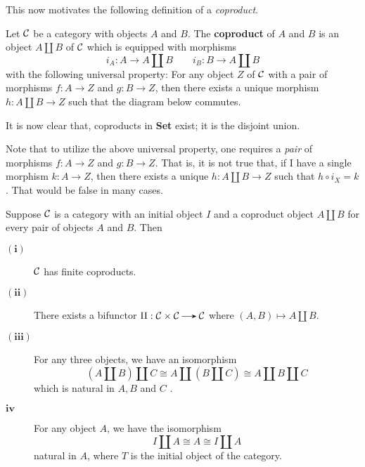 This now motivates the following definition of a \emph{coproduct}. 

\begin{definition}
    Let $\mathcal{C}$ be a category with objects $A$ and $B$. The \textbf{coproduct} of $A$ and $B$ 
    is an object $A \amalg B$ of $\mathcal{C}$ which is equipped with morphisms 
    \[
        i_A: A \to A \amalg B \qquad i_B: B \to A \amalg B
    \]
    with the following universal property: For any object $Z$ of $\mathcal{C}$ with a pair 
    of morphisms $f: A \to Z$ and $g: B \to Z$, then there exists a unique morphism 
    $h: A \amalg B \to Z$ such that the diagram below commutes. 
    \begin{center}
    \end{center}
\end{definition}

It is now clear that, coproducts in \textbf{Set} exist; it is the disjoint union.

\begin{remark}
    Note that to utilize the above universal property, one requires a \emph{pair} of morphisms 
    $f: A \to Z$ and $g: B \to Z$. That is, it is not true that, if I have a single 
    morphism $k: A \to Z$, then there exists a unique $h: A \amalg B \to Z$ such that $h \circ i_X = k$. 
    That would be false in many cases. 
\end{remark}

\begin{proposition}
    Suppose $\mathcal{C}$ is a category with an initial object $I$ and a coproduct
    object $A \amalg B$ for every pair of objects $A$ and $B$. Then 
    \begin{description}
        \item[$\bm{(i)}$] $\mathcal{C}$ has finite coproducts. 
        \item[$\bm{(ii)}$] There exists a bifunctor $\amalg: \cc \times \cc
        \to \cc$ where $(A, B) \mapsto A \amalg B$.

        \item[$\bm{(iii)}$] For any three objects, we have an
        isomorphism 
        \[
            (A \amalg B) \amalg C \cong A \amalg (B \amalg C) \cong A 
            \amalg B \amalg C
        \]
        which is natural in $A, B$ and $C$ .

        \item[$\bm{iv}$] For any object $A$, we have the isomorphism 
        \[
            I \amalg A \cong A \cong I \amalg A            
        \] 
        natural in $A$, where $T$ is the initial object of the category.
    \end{description}
\end{proposition}

